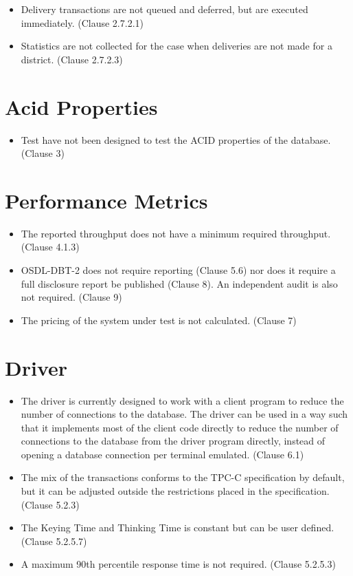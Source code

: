 \documentclass{article}
\begin{document}
\begin{itemize}
\item Delivery transactions are not queued and deferred, but are executed
      immediately.  (Clause 2.7.2.1)

\item Statistics are not collected for the case when deliveries are not made
      for a district.  (Clause 2.7.2.3)
\end{itemize}

\section{Acid Properties}

\begin{itemize}
\item Test have not been designed to test the ACID properties of the database.
      (Clause 3)
\end{itemize}

\section{Performance Metrics}

\begin{itemize}
\item The reported throughput does not have a minimum required throughput.
      (Clause 4.1.3)
\item OSDL-DBT-2 does not require reporting (Clause 5.6) nor does it require
      a full disclosure report be published (Clause 8).  An independent audit
      is also not required.  (Clause 9)
\item The pricing of the system under test is not calculated.  (Clause 7)
\end{itemize}

\section{Driver}

\begin{itemize}
\item The driver is currently designed to work with a client program to
      reduce the number of connections to the database.  The driver can be
      used in a way such that it implements most of the client code directly
      to reduce the number of connections to the database from the driver
      program directly, instead of opening a database connection per terminal
      emulated.  (Clause 6.1)
\item The mix of the transactions conforms to the TPC-C specification by
      default, but it can be adjusted outside the restrictions placed in the
      specification.  (Clause 5.2.3)
\item The Keying Time and Thinking Time is constant but can be user defined.
      (Clause 5.2.5.7)
\item A maximum 90th percentile response time is not required.
      (Clause 5.2.5.3)
\end{itemize}
\end{document}
